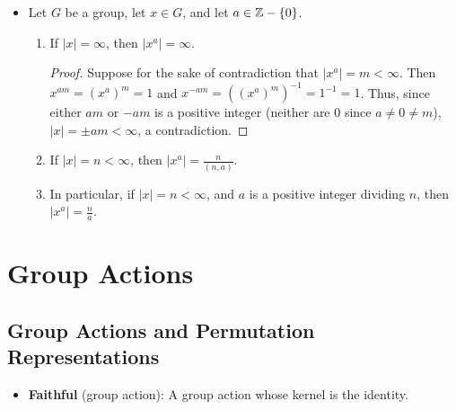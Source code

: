 \documentclass[../notes.tex]{subfiles}
\begin{document}
\begin{itemize}
\begin{theorem}
\begin{enumerate}[label={\textup{\textbf{(\arabic*)}}}]
            \begin{align*}
                \varphi:\Z &\to \langle x\rangle\\
                k &\mapsto x^k
            \end{align*}
            is well defined and is an isomorphism.
            \begin{proof}
                $\varphi$ is automatically well-defined since $\Z$ is well-defined.\par
                By Proposition 2.2, $a\neq b$ implies $x^a\neq x^b$ for all distinct $a,b\in\Z$. Thus, $\varphi$ is injective. By the definition of a cyclic group, $\varphi$ is surjective. Thus, it is bijective. Additionally, laws of exponents prove that it is a homomorphism, as above.
            \end{proof}
        \end{enumerate}
    \end{theorem}
    \item Let $G$ be a group, let $x\in G$, and let $a\in\mathbb{Z}-\{0\}$.
    \begin{proposition}\leavevmode
        \begin{enumerate}[label={\textup{\textbf{(\arabic*)}}}]
            \item If $|x|=\infty$, then $|x^a|=\infty$.
            \begin{proof}
                Suppose for the sake of contradiction that $|x^a|=m<\infty$. Then $x^{am}=(x^a)^m=1$ and $x^{-am}=((x^a)^m)^{-1}=1^{-1}=1$. Thus, since either $am$ or $-am$ is a positive integer (neither are 0 since $a\neq 0\neq m$), $|x|=\pm am<\infty$, a contradiction.
            \end{proof}
            \item If $|x|=n<\infty$, then $|x^a|=\frac{n}{(n,a)}$.
            \item In particular, if $|x|=n<\infty$, and $a$ is a positive integer dividing $n$, then $|x^a|=\frac{n}{a}$.
        \end{enumerate}
    \end{proposition}
\end{itemize}



\chapter{Group Actions}
\section{Group Actions and Permutation Representations}
\begin{itemize}
    \item \textbf{Faithful} (group action): A group action whose kernel is the identity.
\end{itemize}
\end{document}
